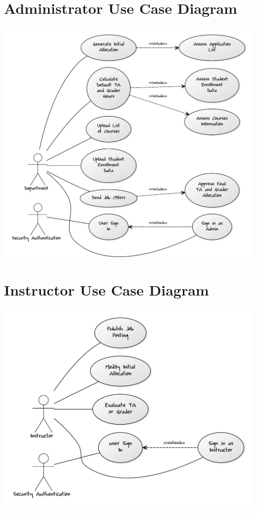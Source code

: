 \documentclass[12pt]{report}
\begin{document}
\section{Administrator Use Case Diagram}
\includegraphics[scale=0.5]{model/Diagrams/UC/departmentUC}
\section{Instructor Use Case Diagram}
\includegraphics[scale=0.5]{model/Diagrams/UC/instructorUC}
\end{document}
